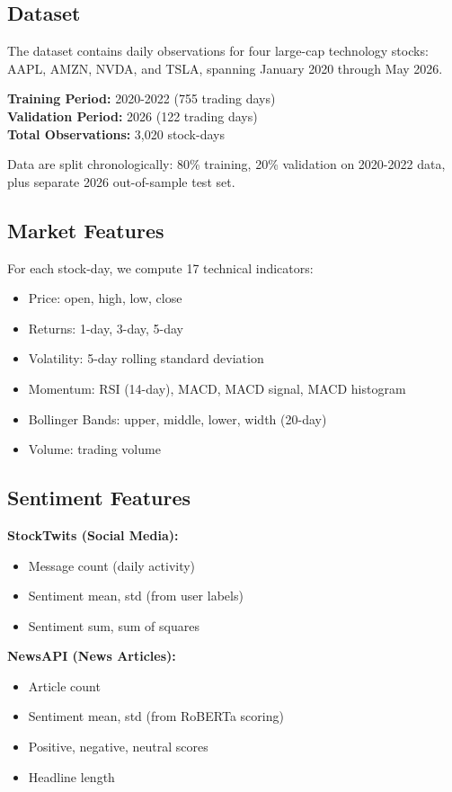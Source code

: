 \documentclass[10pt,twocolumn]{article}
\begin{document}
\subsection{Dataset}

The dataset contains daily observations for four large-cap technology stocks: AAPL, AMZN, NVDA, and TSLA, spanning January 2020 through May 2026.

\textbf{Training Period:} 2020-2022 (755 trading days)\\
\textbf{Validation Period:} 2026 (122 trading days)\\
\textbf{Total Observations:} 3,020 stock-days

Data are split chronologically: 80\% training, 20\% validation on 2020-2022 data, plus separate 2026 out-of-sample test set.

\subsection{Market Features}

For each stock-day, we compute 17 technical indicators:
\begin{itemize}
\item Price: open, high, low, close
\item Returns: 1-day, 3-day, 5-day
\item Volatility: 5-day rolling standard deviation
\item Momentum: RSI (14-day), MACD, MACD signal, MACD histogram
\item Bollinger Bands: upper, middle, lower, width (20-day)
\item Volume: trading volume
\end{itemize}

\subsection{Sentiment Features}

\textbf{StockTwits (Social Media):}
\begin{itemize}
\item Message count (daily activity)
\item Sentiment mean, std (from user labels)
\item Sentiment sum, sum of squares
\end{itemize}

\textbf{NewsAPI (News Articles):}
\begin{itemize}
\item Article count
\item Sentiment mean, std (from RoBERTa scoring)
\item Positive, negative, neutral scores
\item Headline length
\end{itemize}
\end{document}
